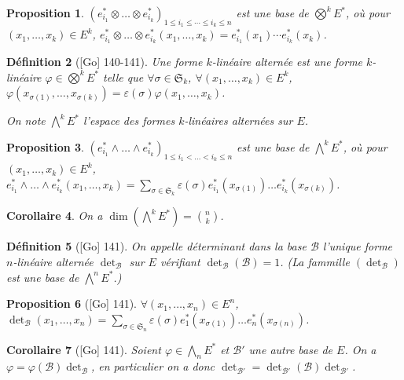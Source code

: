 \documentclass[10pt, a4paper, parskip=full, twoside, twocolumn]{report}
\newtheorem{definition}{Définition}
\newtheorem{proposition}[definition]{Proposition}
\newtheorem{corollary}[definition]{Corollaire}
\begin{document}
\begin{proposition}
	$\left(e_{i_1}^*\otimes \dots\otimes e_{i_k}^*\right)_{1\leq i_1\leq\cdots\leq i_k\leq n}$ est une base de $\bigotimes^k E^*$, où pour $(x_1,\dots, x_k)\in E^k$,
	$e_{i_1}^*\otimes\dots\otimes e_{i_k}^*(x_1,\dots, x_k) = e_{i_1}^*(x_1)\cdots e_{i_k}^*(x_k)$.
\end{proposition}
\begin{definition}[\textnormal{[Go] 140-141}]
	Une forme $k$-linéaire \emph{alternée} est une forme $k$-linéaire $\varphi\in\bigotimes^kE^*$
	telle que $\forall\sigma\in\mathfrak{S}_k$, $\forall(x_1,\dots, x_k)\in E^k$, $\varphi(x_{\sigma(1)},\dots, x_{\sigma(k)}) = \varepsilon(\sigma)\varphi(x_1,\dots, x_k)$.

	On note $\bigwedge^k E^*$ l'espace des formes $k$-linéaires alternées sur $E$.
\end{definition}

\begin{proposition}
	$\left(e_{i_1}^*\wedge \dots \wedge e_{i_k}^*\right)_{1\leq i_1 < \dots < i_k\leq n}$ est une base de $\bigwedge^kE^*$, où pour $(x_1,\dots,x_k)\in E^k$,
	$e_{i_1}^*\wedge \dots \wedge e_{i_k}^*(x_1,\dots,x_k) = \sum_{\sigma\in\mathfrak{S}_k} \varepsilon(\sigma) e_{i_1}^*(x_{\sigma(1)}) \dots e_{i_k}^*(x_{\sigma(k)})$.
\end{proposition}

\begin{corollary}
	On a $\dim\left(\bigwedge^kE^*\right) = {n \choose k}$.
\end{corollary}

\begin{definition}[\textnormal{[Go] 141}]
	On appelle \emph{déterminant dans la base $\mathcal{B}$} l'unique forme $n$-linéaire alternée $\det_{\mathcal{B}}$ sur $E$ vérifiant
	$\det_{\mathcal{B}}(\mathcal{B}) = 1$. (La fammille $\left(\det_{\mathcal{B}}\right)$ est une base de $\bigwedge^n E^*$.)
\end{definition}

\begin{proposition}[\textnormal{[Go] 141}]
	$\forall(x_1,\dots, x_n)\in E^n$, $\det_{\mathcal{B}}(x_1,\dots, x_n) = \sum_{\sigma\in \mathfrak{S}_n} \varepsilon(\sigma)e^*_1(x_{\sigma(1)})\dots e^*_{n}(x_{\sigma(n)})$.
\end{proposition}

\begin{corollary}[\textnormal{[Go] 141}]
	Soient $\varphi\in \bigwedge_n E^*$ et $\mathcal{B}'$ une autre base de $E$. On a $\varphi = \varphi(\mathcal{B})\det_{\mathcal{B}}$,
	en particulier on a donc $\det_{\mathcal{B}'} = \det_{\mathcal{B}'}(\mathcal{B})\det_{\mathcal{B}'}$.
\end{corollary}
\end{document}
